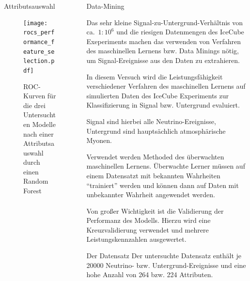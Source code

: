 \documentclass[t]{beamer}
\begin{document}
\begin{columns}[onlytextwidth]
\begin{column}{0.5\textwidth}
      \begin{block}{Attributsauswahl}
        \begin{multicols}{2}
          \begin{figure}
            \centering
            \texttt{[image: rocs\_performance\_feature\_selection.pdf]}
            \caption{ROC-Kurven für die drei Untersuchten Modelle nach einer
              Attributsauswahl durch einen Random Forest}
            \label{fig:name}
          \end{figure}
          \begin{center}
            
          \end{center}
        \end{multicols}
      \end{block}
    \end{column}%
    \begin{column}{0.5\textwidth}%
      \begin{block}{Data-Mining}%
        \begin{multicols}{2}
          Das sehr kleine Signal-zu-Untergrund-Verhältnis von ca.\ $1:10^6$ und die
          riesigen Datenmengen des IceCube Exeperiments machen das
          verwenden von Verfahren des maschinellen Lernens bzw. Data Minings nötig,
          um Signal-Ereignisse aus den Daten zu extrahieren.

          In diesem Versuch wird die Leistungsfähigkeit verschiedener Verfahren
          des maschinellen Lernens auf simulierten Daten des IceCube Experiments
          zur Klassifizierung in Signal bzw. Untergrund evaluiert.

          Signal sind hierbei alle Neutrino-Ereignisse, Untergrund sind hauptsächlich
          atmosphärische Myonen.

          Verwendet werden Methoded des überwachten maschinellen Lernens.
          Überwachte Lerner müssen auf einem Datensatzt mit bekannten Wahrheiten
          \enquote{trainiert} werden und können dann auf Daten mit unbekannter
          Wahrheit angewendet werden.

          Von großer Wichtigkeit ist die Validierung der Performanz des Modells.
          Hierzu wird eine Kreuzvalidierung verwendet und mehrere Leistungskennzahlen
          ausgewertet.
        \end{multicols}
      \end{block}%

      \begin{block}{Der Datensatz}
      Der untersuchte Datensatz enthält je \num{20000} Neutrino- bzw. Untergrund-Ereignisse
      und eine hohe Anzahl von 264 bzw. 224 Attributen.


\end{block}
\end{column}
\end{columns}
\end{document}
